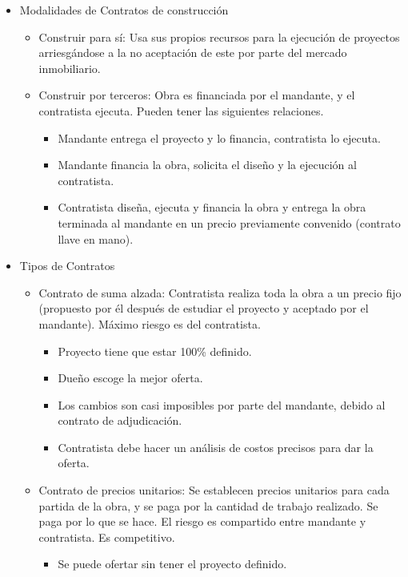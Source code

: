 \begin{itemize}
    \item Modalidades de Contratos de construcción
    \begin{itemize}
        \item Construir para sí: Usa sus propios recursos para la ejecución de proyectos arriesgándose a la no aceptación de este por parte del mercado inmobiliario.
        \item Construir por terceros: Obra es financiada por el mandante, y el contratista ejecuta. Pueden tener las siguientes relaciones.
        \begin{itemize}
            \item Mandante entrega el proyecto y lo financia, contratista lo ejecuta.
            \item Mandante financia la obra, solicita el diseño y la ejecución al contratista.
            \item Contratista diseña, ejecuta y financia la obra y entrega la obra terminada al mandante en un precio previamente convenido (contrato llave en mano).
        \end{itemize}
    \end{itemize}
    \item Tipos de Contratos
    \begin{itemize}
        \item Contrato de suma alzada: Contratista realiza toda la obra a un precio fijo (propuesto por él después de estudiar el proyecto y aceptado por el mandante). Máximo riesgo es del contratista.
        \begin{itemize}
            \item Proyecto tiene que estar 100\% definido.
            \item Dueño escoge la mejor oferta.
            \item Los cambios son casi imposibles por parte del mandante, debido al contrato de adjudicación.
            \item Contratista debe hacer un análisis de costos precisos para dar la oferta.
        \end{itemize}
        \item Contrato de precios unitarios: Se establecen precios unitarios para cada partida de la obra, y se paga por la cantidad de trabajo realizado. Se paga por lo que se hace. El riesgo es compartido entre mandante y contratista. Es competitivo.
        \begin{itemize}
            \item Se puede ofertar sin tener el proyecto definido.

\end{itemize}
\end{itemize}
\end{itemize}
